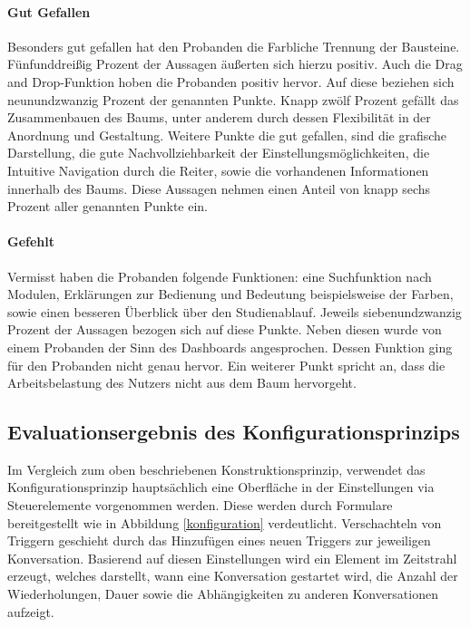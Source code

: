 \paragraph{Gut Gefallen}Besonders gut gefallen hat den Probanden die Farbliche Trennung der Bausteine.  Fünfunddreißig Prozent der Aussagen äußerten sich hierzu positiv. Auch die Drag and Drop-Funktion hoben die Probanden positiv hervor. Auf diese beziehen sich neunundzwanzig Prozent der genannten Punkte. Knapp zwölf Prozent gefällt das Zusammenbauen des Baums, unter anderem durch dessen Flexibilität in der Anordnung und Gestaltung. Weitere Punkte die gut gefallen, sind die grafische Darstellung, die gute Nachvollziehbarkeit der Einstellungsmöglichkeiten, die Intuitive Navigation durch die Reiter, sowie die vorhandenen Informationen innerhalb des Baums. Diese Aussagen nehmen einen Anteil von knapp sechs Prozent aller genannten Punkte ein.

\paragraph{Gefehlt}Vermisst haben die Probanden folgende Funktionen: eine Suchfunktion nach Modulen, Erklärungen zur Bedienung und Bedeutung beispielsweise der Farben, sowie einen besseren Überblick über den Studienablauf. Jeweils siebenundzwanzig Prozent der Aussagen bezogen sich auf diese Punkte. Neben diesen wurde von einem Probanden der Sinn des Dashboards angesprochen. Dessen Funktion ging für den Probanden nicht genau hervor. Ein weiterer Punkt spricht an, dass die Arbeitsbelastung des Nutzers nicht aus dem Baum hervorgeht.



\subsection{Evaluationsergebnis des Konfigurationsprinzips}
Im Vergleich zum oben beschriebenen Konstruktionsprinzip, verwendet das Konfigurationsprinzip hauptsächlich eine Oberfläche in der Einstellungen via Steuerelemente vorgenommen werden. Diese werden durch Formulare bereitgestellt wie in Abbildung \ref{konfiguration} verdeutlicht. Verschachteln von Triggern geschieht durch das Hinzufügen eines neuen Triggers zur jeweiligen Konversation. Basierend auf diesen Einstellungen wird ein Element im Zeitstrahl erzeugt, welches darstellt, wann eine Konversation gestartet wird, die Anzahl der Wiederholungen, Dauer sowie die Abhängigkeiten zu anderen Konversationen aufzeigt. 


